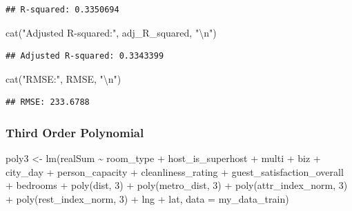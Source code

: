\documentclass[
]{article}
\newenvironment{Shaded}{\begin{snugshade}}{\end{snugshade}}
\newcommand{\AttributeTok}[1]{\textcolor[rgb]{0.77,0.63,0.00}{#1}}
\newcommand{\DecValTok}[1]{\textcolor[rgb]{0.00,0.00,0.81}{#1}}
\newcommand{\FunctionTok}[1]{\textcolor[rgb]{0.00,0.00,0.00}{#1}}
\newcommand{\NormalTok}[1]{#1}
\newcommand{\OtherTok}[1]{\textcolor[rgb]{0.56,0.35,0.01}{#1}}
\newcommand{\SpecialCharTok}[1]{\textcolor[rgb]{0.00,0.00,0.00}{#1}}
\newcommand{\StringTok}[1]{\textcolor[rgb]{0.31,0.60,0.02}{#1}}
\begin{document}
\begin{verbatim}
## R-squared: 0.3350694
\end{verbatim}

\begin{Shaded}
\begin{Highlighting}[]
\FunctionTok{cat}\NormalTok{(}\StringTok{"Adjusted R{-}squared:"}\NormalTok{, adj\_R\_squared, }\StringTok{"}\SpecialCharTok{\textbackslash{}n}\StringTok{"}\NormalTok{)}
\end{Highlighting}
\end{Shaded}

\begin{verbatim}
## Adjusted R-squared: 0.3343399
\end{verbatim}

\begin{Shaded}
\begin{Highlighting}[]
\FunctionTok{cat}\NormalTok{(}\StringTok{"RMSE:"}\NormalTok{, RMSE, }\StringTok{"}\SpecialCharTok{\textbackslash{}n}\StringTok{"}\NormalTok{)}
\end{Highlighting}
\end{Shaded}

\begin{verbatim}
## RMSE: 233.6788
\end{verbatim}

\hypertarget{third-order-polynomial}{%
\subsubsection{Third Order Polynomial}\label{third-order-polynomial}}

\begin{Shaded}
\begin{Highlighting}[]
\NormalTok{poly3 }\OtherTok{\textless{}{-}} \FunctionTok{lm}\NormalTok{(realSum }\SpecialCharTok{\textasciitilde{}}\NormalTok{ room\_type }\SpecialCharTok{+}\NormalTok{ host\_is\_superhost }\SpecialCharTok{+}\NormalTok{ multi }\SpecialCharTok{+}
\NormalTok{    biz }\SpecialCharTok{+}\NormalTok{ city\_day }\SpecialCharTok{+}\NormalTok{ person\_capacity }\SpecialCharTok{+}\NormalTok{ cleanliness\_rating }\SpecialCharTok{+}\NormalTok{ guest\_satisfaction\_overall }\SpecialCharTok{+}
\NormalTok{    bedrooms }\SpecialCharTok{+} \FunctionTok{poly}\NormalTok{(dist, }\DecValTok{3}\NormalTok{) }\SpecialCharTok{+} \FunctionTok{poly}\NormalTok{(metro\_dist, }\DecValTok{3}\NormalTok{) }\SpecialCharTok{+} \FunctionTok{poly}\NormalTok{(attr\_index\_norm,}
    \DecValTok{3}\NormalTok{) }\SpecialCharTok{+} \FunctionTok{poly}\NormalTok{(rest\_index\_norm, }\DecValTok{3}\NormalTok{) }\SpecialCharTok{+}\NormalTok{ lng }\SpecialCharTok{+}\NormalTok{ lat, }\AttributeTok{data =}\NormalTok{ my\_data\_train)}
\end{Highlighting}
\end{Shaded}
\end{document}
